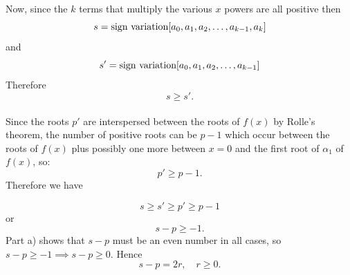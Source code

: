 Now, since the  $k$  terms that multiply the various $x$ powers are all positive then $$ s= \hbox{sign variation} [a_0,a_1,a_2,\hdots,a_{k-1},a_k]$$ and
$$s' = \hbox{sign variation} [a_0,a_1,a_2,\hdots,a_{k-1}]$$ Therefore $$s\ge s'.$$\\

Since the roots $p'$ are interspersed between the roots of $f(x)$ by Rolle's theorem, the number of positive roots can be $p-1$ which occur between the roots of $f(x)$ plus possibly one more between $x=0$ and the first root of $\alpha_1$ of $f(x)$, so: $$p' \ge p -1.$$ Therefore we have 

\[ s \ge s' \ge p' \ge p - 1 \] or \[ s- p \ge -1. \] Part a) shows that $s-p$ must be an even number in all cases, so $s-p\ge -1 \implies s-p \ge 0$. Hence $$s-p=2r, \quad r \ge 0.$$



